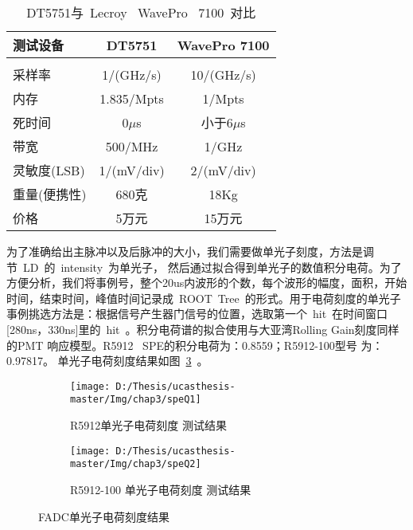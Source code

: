 \begin{table}[htbp]
\centering  %
\begin{tabular}{lcc}  %
\hline
测试设备 &DT5751 &WavePro 7100 \\ \hline
\\  采样率&1/(GHz/s) &10/(GHz/s) 
\\  内存 &1.835/Mpts &1/Mpts
\\  死时间& 0$\mu$s &小于6$\mu$s
\\   带宽 &500/MHz &1/GHz
\\   灵敏度(LSB)&1/(mV/div)& 2/(mV/div)
\\  重量(便携性)& 680克 & 18Kg
\\ 价格& 5万元& 15万元
\\ \hline
\end{tabular}
\caption{DT5751与~Lecroy~ WavePro ~7100~对比}
\label{tab:dtwa}
\end{table}

为了准确给出主脉冲以及后脉冲的大小，我们需要做单光子刻度，方法是调节~LD~的~intensity~为单光子， 然后通过拟合得到单光子的数值积分电荷。为了方便分析，我们将事例号，整个20us内波形的个数，每个波形的幅度，面积，开始时间，结束时间，峰值时间记录成~ROOT~Tree~的形式。用于电荷刻度的单光子事例挑选方法是：根据信号产生器门信号的位置，选取第一个~hit~在时间窗口[280ns，330ns]里的~hit~。积分电荷谱的拟合使用与大亚湾Rolling Gain刻度同样的PMT 响应模型。R5912 ~SPE的积分电荷为：0.8559；R5912-100型号 为：0.97817。 单光子电荷刻度结果如图~\ref{fig:speQ}~。
\begin{figure}[!htbp]
  \centering
  \begin{subfigure}[b]{\MySubFactor\textwidth}
    \texttt{[image: D:/Thesis/ucasthesis-master/Img/chap3/speQ1]}
    \caption{R5912单光子电荷刻度 测试结果}
    \label{fig:speQ_1}
  \end{subfigure}%
  \quad\quad\quad\quad%
  \begin{subfigure}[b]{\MySubFactor\textwidth}
    \texttt{[image: D:/Thesis/ucasthesis-master/Img/chap3/speQ2]}
    \caption{R5912-100 单光子电荷刻度 测试结果}
    \label{fig:speQ_2}
  \end{subfigure}
  \caption{FADC单光子电荷刻度结果}
  \label{fig:speQ}
\end{figure}

